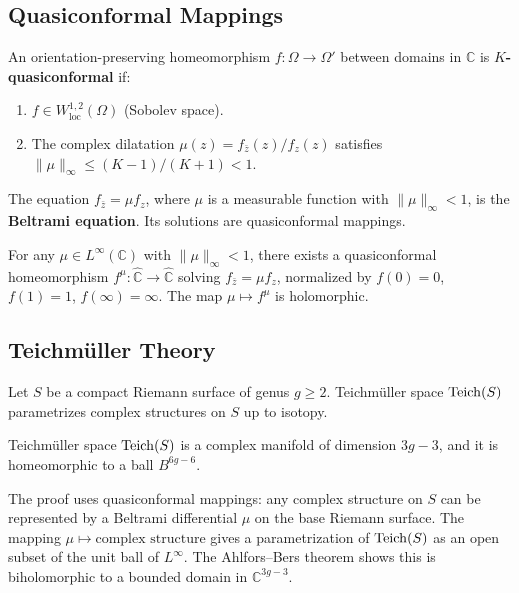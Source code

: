 \subsection{Quasiconformal Mappings}

\begin{definition}
An orientation-preserving homeomorphism $f: \Omega \to \Omega'$ between domains in $\mathbb{C}$ is \textbf{$K$-quasiconformal} if:
\begin{enumerate}
    \item $f \in W^{1,2}_{\text{loc}}(\Omega)$ (Sobolev space).
    \item The complex dilatation $\mu(z) = f_{\bar z}(z)/f_z(z)$ satisfies $\|\mu\|_\infty \leq (K-1)/(K+1) < 1$.
\end{enumerate}
\end{definition}

\begin{definition}
The equation $f_{\bar z} = \mu f_z$, where $\mu$ is a measurable function with $\|\mu\|_\infty < 1$, is the \textbf{Beltrami equation}. Its solutions are quasiconformal mappings.
\end{definition}

\begin{theorem}
For any $\mu \in L^\infty(\mathbb{C})$ with $\|\mu\|_\infty < 1$, there exists a quasiconformal homeomorphism $f^\mu: \widehat{\mathbb{C}} \to \widehat{\mathbb{C}}$ solving $f_{\bar z} = \mu f_z$, normalized by $f(0) = 0$, $f(1) = 1$, $f(\infty) = \infty$. The map $\mu \mapsto f^\mu$ is holomorphic.
\end{theorem}

\subsection{Teichm{\"u}ller Theory}

Let $S$ be a compact Riemann surface of genus $g \geq 2$. Teichm{\"u}ller space $\operatorname{Teich}(S)$ parametrizes complex structures on $S$ up to isotopy.

\begin{theorem}
Teichm{\"u}ller space $\operatorname{Teich}(S)$ is a complex manifold of dimension $3g-3$, and it is homeomorphic to a ball $B^{6g-6}$.
\end{theorem}

The proof uses quasiconformal mappings: any complex structure on $S$ can be represented by a Beltrami differential $\mu$ on the base Riemann surface. The mapping $\mu \mapsto \text{complex structure}$ gives a parametrization of $\operatorname{Teich}(S)$ as an open subset of the unit ball of $L^\infty$. The Ahlfors--Bers theorem shows this is biholomorphic to a bounded domain in $\mathbb{C}^{3g-3}$.


